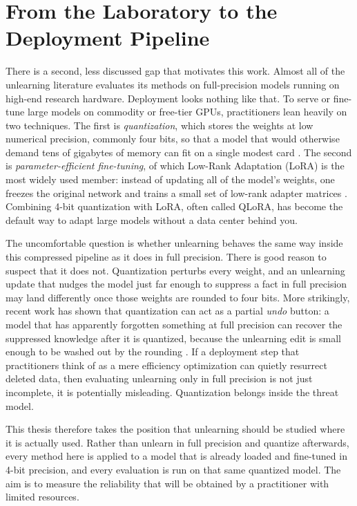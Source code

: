 \documentclass[a4paper,12pt]{report}
\begin{document}
\section{From the Laboratory to the Deployment Pipeline}
There is a second, less discussed gap that motivates this work. Almost all of the unlearning literature evaluates its methods on full-precision models running on high-end research hardware. Deployment looks nothing like that. To serve or fine-tune large models on commodity or free-tier GPUs, practitioners lean heavily on two techniques. The first is \emph{quantization}, which stores the weights at low numerical precision, commonly four bits, so that a model that would otherwise demand tens of gigabytes of memory can fit on a single modest card \parencite{dettmers2022int8, dettmers2023qlora}. The second is \emph{parameter-efficient fine-tuning}, of which Low-Rank Adaptation (LoRA) is the most widely used member: instead of updating all of the model's weights, one freezes the original network and trains a small set of low-rank adapter matrices \parencite{hu2022lora}. Combining 4-bit quantization with LoRA, often called QLoRA, has become the default way to adapt large models without a data center behind you.

The uncomfortable question is whether unlearning behaves the same way inside this compressed pipeline as it does in full precision. There is good reason to suspect that it does not. Quantization perturbs every weight, and an unlearning update that nudges the model just far enough to suppress a fact in full precision may land differently once those weights are rounded to four bits. More strikingly, recent work has shown that quantization can act as a partial \emph{undo} button: a model that has apparently forgotten something at full precision can recover the suppressed knowledge after it is quantized, because the unlearning edit is small enough to be washed out by the rounding \parencite{zhang2024quantization}. If a deployment step that practitioners think of as a mere efficiency optimization can quietly resurrect deleted data, then evaluating unlearning only in full precision is not just incomplete, it is potentially misleading. Quantization belongs inside the threat model.

This thesis therefore takes the position that unlearning should be studied where it is actually used. Rather than unlearn in full precision and quantize afterwards, every method here is applied to a model that is already loaded and fine-tuned in 4-bit precision, and every evaluation is run on that same quantized model. The aim is to measure the reliability that will be obtained by a practitioner with limited resources.
\end{document}
